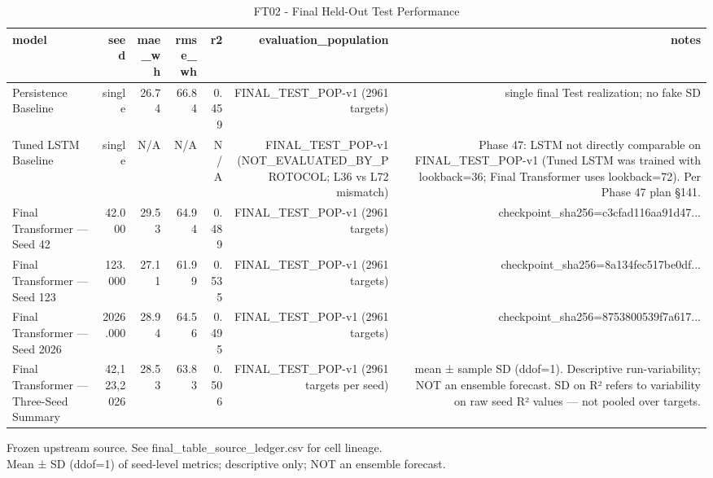 \begin{table}[h!]
\centering
\caption{FT02 - Final Held-Out Test Performance}
\label{tab:ft02\_-\_final\_held-out\_test\_performance}
\begin{tabular}{lrrrrrr}
\toprule
model & seed & mae\_wh & rmse\_wh & r2 & evaluation\_population & notes \\
\midrule
Persistence Baseline & single & 26.74 & 66.84 & 0.459 & FINAL\_TEST\_POP-v1 (2961 targets) & single final Test realization; no fake SD \\
Tuned LSTM Baseline & single & N/A & N/A & N/A & FINAL\_TEST\_POP-v1 (NOT\_EVALUATED\_BY\_PROTOCOL; L36 vs L72 mismatch) & Phase 47: LSTM not directly comparable on FINAL\_TEST\_POP-v1 (Tuned LSTM was trained with lookback=36; Final Transformer uses lookback=72). Per Phase 47 plan §141. \\
Final Transformer — Seed 42 & 42.000 & 29.53 & 64.94 & 0.489 & FINAL\_TEST\_POP-v1 (2961 targets) & checkpoint\_sha256=c3cfad116aa91d47... \\
Final Transformer — Seed 123 & 123.000 & 27.11 & 61.99 & 0.535 & FINAL\_TEST\_POP-v1 (2961 targets) & checkpoint\_sha256=8a134fec517be0df... \\
Final Transformer — Seed 2026 & 2026.000 & 28.94 & 64.56 & 0.495 & FINAL\_TEST\_POP-v1 (2961 targets) & checkpoint\_sha256=8753800539f7a617... \\
Final Transformer — Three-Seed Summary & 42,123,2026 & 28.53 & 63.83 & 0.506 & FINAL\_TEST\_POP-v1 (2961 targets per seed) & mean ± sample SD (ddof=1). Descriptive run-variability; NOT an ensemble forecast. SD on R² refers to variability on raw seed R² values — not pooled over targets. \\
\bottomrule
\end{tabular}
\vspace{4pt}
\footnotesize{Frozen upstream source. See final\_table\_source\_ledger.csv for cell lineage.}\\
\footnotesize{Mean ± SD (ddof=1) of seed-level metrics; descriptive only; NOT an ensemble forecast.}\\
\end{table}
